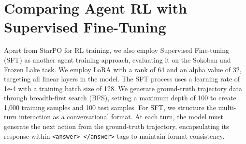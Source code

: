 


\section{Comparing Agent RL with Supervised Fine-Tuning}

Apart from StarPO for RL training, we also employ Supervised Fine-tuning (SFT) as another agent training approach, evaluating it on the Sokoban and Frozen Lake task.
We employ LoRA with a rank of 64 and an alpha value of 32, targeting all linear layers in the model. The SFT process uses a learning rate of 1e-4 with a training batch size of 128. 
We generate ground-truth trajectory data through breadth-first search (BFS), setting a maximum depth of 100 to create 1,000 training samples and 100 test samples. For SFT, we structure the multi-turn interaction as a conversational format. At each turn, the model must generate the next action from the ground-truth trajectory, encapsulating its response within \texttt{<answer> </answer>} tags to maintain format consistency.

